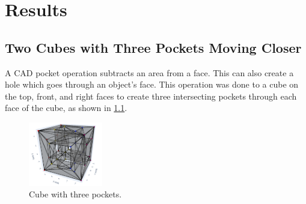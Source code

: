 \documentclass[ma]{uncgdissertationexp}
\theoremstyle{plain}
\theoremstyle{definition}
\theoremstyle{remark}
\begin{document}
\chapter{Results}
\section{Two Cubes with Three Pockets Moving Closer}
\begin{multicols}{2}
A CAD pocket operation subtracts an area from a face. This can also create a hole which goes through an object's face. This operation was done to a cube on the top, front, and right faces to create three intersecting pockets through each face of the cube, as shown in \ref{fig:three_pocket_example}.
\columnbreak
\begin{figure}[H]
\begin{center}
	\includegraphics[height=1.1in]{one cube three pockets each.png}
    \caption{Cube with three pockets.}
\label{fig:three_pocket_example}
\end{center}
\end{figure}
\end{multicols}
\vspace{-7.5mm}
\end{document}

